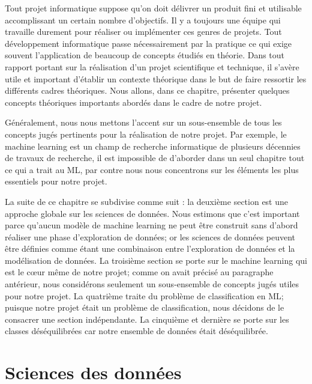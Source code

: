 \documentclass[12pt, french]{report}
\begin{document}
Tout projet informatique suppose qu'on doit délivrer un produit fini et utilisable accomplissant un certain nombre d'objectifs. Il y a toujours une équipe qui travaille durement pour réaliser ou implémenter ces genres de projets. Tout développement informatique passe nécessairement par la pratique ce qui exige souvent l'application de beaucoup de concepts étudiés en théorie. Dans tout rapport portant sur la réalisation d'un projet scientifique et technique, il s'avère utile et important d'établir un contexte théorique dans le but de faire ressortir les différents cadres théoriques. Nous allons, dans ce chapitre, présenter quelques concepts théoriques importants abordés dans le cadre de notre projet.

Généralement, nous nous mettons l'accent sur un sous-ensemble de tous les concepts jugés pertinents pour la réalisation de notre projet. Par exemple, le machine learning est un champ de recherche informatique de plusieurs décennies de travaux de recherche, il est impossible de d'aborder dans un seul chapitre tout ce qui a trait au ML, par contre nous nous concentrons sur les éléments les plus essentiels pour notre projet.       

La suite de ce chapitre se subdivise comme suit : la deuxième section est une approche globale sur les sciences de données. Nous estimons que c'est important parce qu'aucun modèle de machine learning ne peut être construit sans d'abord réaliser une phase d'exploration de données; or les sciences de données peuvent être définies comme étant une combinaison entre l'exploration de données et la modélisation de données. La troisième section se porte sur le machine learning qui est le cœur même de notre projet; comme on avait précisé au paragraphe antérieur, nous considérons seulement un sous-ensemble de concepts jugés utiles pour notre projet. La quatrième traite du problème de classification en ML; puisque notre projet était un problème de classification, nous décidons de le consacrer une section indépendante. La cinquième et dernière se porte sur les classes déséquilibrées car notre ensemble de données était déséquilibrée.     

\section{Sciences des données}
\end{document}
